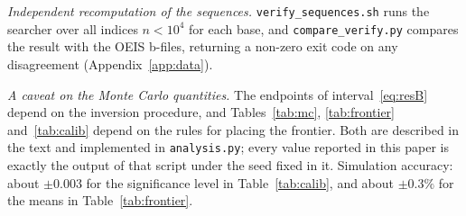 \documentclass[11pt,a4paper]{article}
\theoremstyle{plain}
\theoremstyle{remark}
\begin{document}
\emph{Independent recomputation of the sequences.}
\texttt{verify\_sequences.sh} runs the searcher over all indices $n<10^4$ for
each base, and \texttt{compare\_verify.py} compares the result with the OEIS
b-files, returning a non-zero exit code on any disagreement
(Appendix~\ref{app:data}).

\emph{A caveat on the Monte Carlo quantities.} The endpoints of
interval~\eqref{eq:resB} depend on the inversion procedure, and
Tables~\ref{tab:mc}, \ref{tab:frontier} and~\ref{tab:calib} depend on the rules
for placing the frontier. Both are described in the text and implemented in
\texttt{analysis.py}; every value reported in this paper is exactly the output
of that script under the seed fixed in it. Simulation accuracy: about $\pm0.003$
for the significance level in Table~\ref{tab:calib}, and about $\pm0.3\%$ for
the means in Table~\ref{tab:frontier}.
\end{document}
